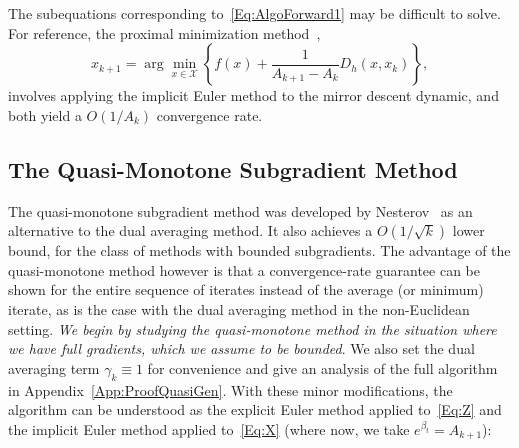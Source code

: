 \documentclass[11pt]{article}
\theoremstyle{plain}
\newcommand{\X}{{\mathcal X}}
\begin{document}
The subequations corresponding to~\eqref{Eq:AlgoForward1} may be difficult to solve. For reference, the proximal minimization method~\cite{ChenTeboulle93}, 
\begin{equation}
x_{k+1} = \arg\min_{x\in\X} \left\{ f(x) + \frac{1}{A_{k+1} - A_k}D_h\left(x, x_k\right)\right\},
\end{equation}
involves applying the implicit Euler method to the mirror descent dynamic, and both yield a $O(1/A_k)$ convergence rate. 

\subsection{The Quasi-Monotone Subgradient Method}
\label{Sec:QuasiMono}
The quasi-monotone subgradient method was developed by Nesterov~\cite{Nesterov15} as an alternative to the dual averaging method.  It also achieves a $O(1/\sqrt{k})$ lower bound, for the class of methods with bounded subgradients. The advantage of the quasi-monotone method however is that a convergence-rate guarantee can be shown for the entire sequence of iterates instead of the average (or minimum) iterate, as is the case with the dual averaging method in the non-Euclidean setting. {\em We begin by studying the quasi-monotone method in the situation where we have full gradients, which we assume to be bounded}. We also set the dual averaging term $\gamma_k \equiv 1$ for convenience and give an analysis of the full algorithm in Appendix~\ref{App:ProofQuasiGen}.  With these minor modifications, the algorithm can be understood as the explicit Euler method applied to~\eqref{Eq:Z} and the implicit Euler method applied to~\eqref{Eq:X} (where now, we take $e^{\beta_t} = A_{k+1}$):
\end{document}
